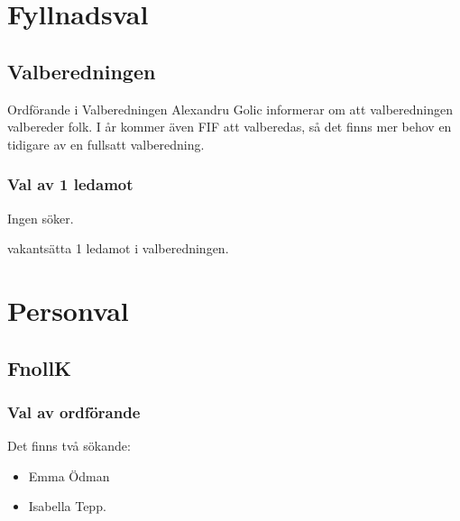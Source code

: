\documentclass[hidelinks]{sektionsmote}
\begin{document}
\section{Fyllnadsval}
\subsection{Valberedningen}
Ordförande i Valberedningen Alexandru Golic informerar om att valberedningen valbereder folk.
I år kommer även FIF att valberedas, så det finns mer behov en tidigare av en fullsatt valberedning.

\subsubsection{Val av 1 ledamot}
Ingen söker.
\begin{beslut}
  \item vakantsätta 1 ledamot i valberedningen.
\end{beslut}


\section{Personval}
\subsection{FnollK}
\subsubsection{Val av ordförande}
Det finns två sökande:
\begin{itemize}
    \item Emma Ödman
    \item Isabella Tepp.
\end{itemize}
\end{document}

